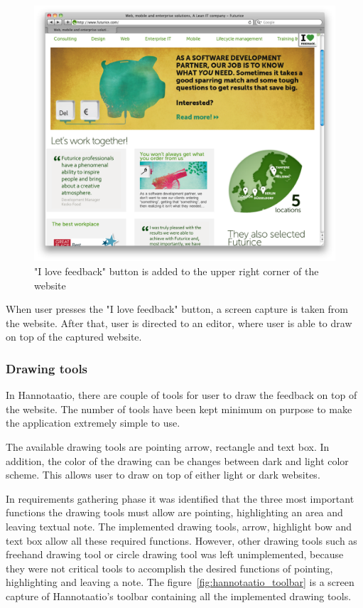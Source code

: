 \documentclass[english,12pt,a4paper,pdftex]{article}
\begin{document}
\begin{figure}[htb]
\begin{center}
\includegraphics[width=1.0\textwidth]{initiate_feedback.png}
\end{center}
\caption{"I love feedback" button is added to the upper right corner of the website}
\end{figure}

When user presses the "I love feedback" button, a screen capture is taken from the website. After that, user is directed to an editor, where user is able to draw on top of the captured website.

\subsubsection{Drawing tools}

In Hannotaatio, there are couple of tools for user to draw the feedback on top of the website. The number of tools have been kept minimum on purpose to make the application extremely simple to use.

The available drawing tools are pointing arrow, rectangle and text box. In addition, the color of the drawing can be changes between dark and light color scheme. This allows user to draw on top of either light or dark websites.

In requirements gathering phase it was identified that the three most important functions the drawing tools must allow are pointing, highlighting an area and leaving textual note. The implemented drawing tools, arrow, highlight bow and text box allow all these required functions. However, other drawing tools such as freehand drawing tool or circle drawing tool was left unimplemented, because they were not critical tools to accomplish the desired functions of pointing, highlighting and leaving a note. The figure~\ref{fig:hannotaatio_toolbar} is a screen capture of Hannotaatio's toolbar containing all the implemented drawing tools.
\end{document}
